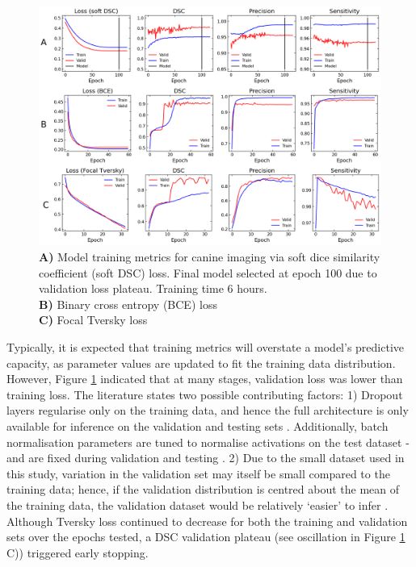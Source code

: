 

\begin{figure}[H]
	\begin{center}
		\hspace*{-1.2cm}\includegraphics[width=1.15\textwidth]{figures/vacbag_metrics_combined}
		\caption{\textbf{A)} Model training metrics for canine imaging via soft dice similarity coefficient (soft DSC) loss. Final model selected at epoch 100 due to validation loss plateau. Training time 6 hours.\\
		\textbf{B)} Binary cross entropy (BCE) loss\\
		\textbf{C)} Focal Tversky loss}
		\label{fig:vet_metrics}
	\end{center}
\end{figure}

Typically, it is expected that training metrics will overstate a model's predictive capacity, as parameter values are updated to fit the training data distribution. However, Figure \ref{fig:vet_metrics} indicated that at many stages, validation loss was lower than training loss. The literature states two possible contributing factors: 1) Dropout layers regularise only on the training data, and hence the full architecture is only available for inference on the validation and testing sets \cite{srivastava2014}. Additionally, batch normalisation parameters are tuned to normalise activations on the test dataset - and are fixed during validation and testing \cite{santurkar2018}. 2) Due to the small dataset used in this study, variation in the validation set may itself be small compared to the training data; hence, if the validation distribution is centred about the mean of the training data, the validation dataset would be relatively `easier' to infer \cite{Bishop}. Although Tversky loss continued to decrease for both the training and validation sets over the epochs tested, a DSC validation plateau (see oscillation in Figure \ref{fig:vet_metrics} C)) triggered early stopping.

